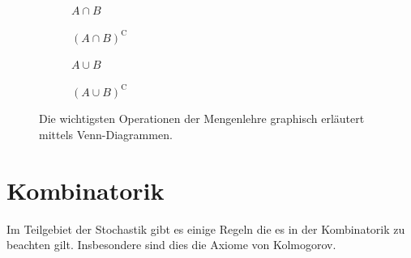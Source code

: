 \begin{figure}[h!]
	\rule[1mm]{0mm}{5mm}

	\begin{subfigure}[b]{0.45\textwidth}
		\centering
		\begin{venndiagram2sets}[tikzoptions={scale=0.7}]
    			\fillACapB
		\end{venndiagram2sets}
		\caption{$A \cap B$}
	\end{subfigure}
	\begin{subfigure}[b]{0.45\textwidth}
		\centering
		\begin{venndiagram2sets}[tikzoptions={scale=0.7}]
			\fillNotAorNotB
		\end{venndiagram2sets}
		\caption{${(A\cap B)}^{\mathrm C}$}
	\end{subfigure}

	\rule[1mm]{0mm}{5mm}

	\begin{subfigure}[b]{0.45\textwidth}
		\centering
		\begin{venndiagram2sets}[tikzoptions={scale=0.7}]
			\fillA \fillB
		\end{venndiagram2sets}
		\caption{$A \cup B$}
	\end{subfigure}	
	\begin{subfigure}[b]{0.45\textwidth}
		\centering
		\begin{venndiagram2sets}[tikzoptions={scale=0.7}]
			\fillNotAorB
		\end{venndiagram2sets}
		\caption{${(A \cup B)}^{\mathrm C}$}
	\end{subfigure}
	\caption{Die wichtigsten Operationen der Mengenlehre graphisch
	erläutert mittels Venn-Diagrammen.}
\end{figure}

\section{Kombinatorik}
Im Teilgebiet der Stochastik gibt es einige Regeln die es in der 
Kombinatorik zu beachten gilt. Insbesondere sind dies die 
\gls{Axiome von Kolmogorov}.

